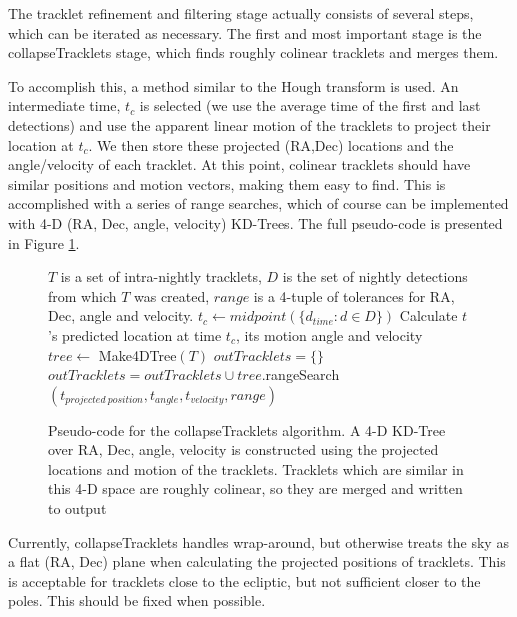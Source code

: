 The tracklet refinement and filtering stage actually consists of
several steps, which can be iterated as necessary.  The first and most
important stage is the collapseTracklets stage, which finds roughly
colinear tracklets and merges them.  

To accomplish this, a method similar to the Hough transform is used.
An intermediate time, $t_c$ is selected (we use the average time of
the first and last detections) and use the apparent linear motion of
the tracklets to project their location at $t_c$.  We then store these
projected (RA,Dec) locations and the angle/velocity of each tracklet.
At this point, colinear tracklets should have similar positions and
motion vectors, making them easy to find.  This is accomplished with a
series of range searches, which of course can be implemented with 4-D
(RA, Dec, angle, velocity) KD-Trees.  The full pseudo-code is
presented in Figure \ref{collapseTrackletsAlgorithm}.

\begin{figure}[ht!]
\begin{algorithmic}
  \REQUIRE $T$ is a set of intra-nightly tracklets, $D$ is the set of nightly detections from which $T$ was created, $range$ is a 4-tuple of tolerances for RA, Dec, angle and velocity.
  \STATE $t_c \gets midpoint(\{ d_{time} : d \in D \})$
    \STATE Calculate $t$'s predicted location at time $t_c$, its motion angle and velocity
  \ENDFOR
  \STATE {}
  \STATE $tree \gets$ Make4DTree$(T)$
  \STATE $outTracklets = \{\}$
    \STATE {}
     \STATE $outTracklets = outTracklets \cup tree.$rangeSearch$(t_{projected\ position}, t_{angle}, t_{velocity}, range)$
  \ENDFOR
\end{algorithmic}

\caption{Pseudo-code for the collapseTracklets algorithm. A 4-D KD-Tree over RA, Dec, angle, velocity is constructed using the projected locations and motion of the tracklets.  Tracklets which are similar in this 4-D space are roughly colinear, so they are merged and written to output}

\label{collapseTrackletsAlgorithm}

\end{figure}

Currently, collapseTracklets handles wrap-around, but otherwise treats
the sky as a flat (RA, Dec) plane when calculating the projected
positions of tracklets.  This is acceptable for tracklets close to the
ecliptic, but not sufficient closer to the poles.  This should be
fixed when possible.

